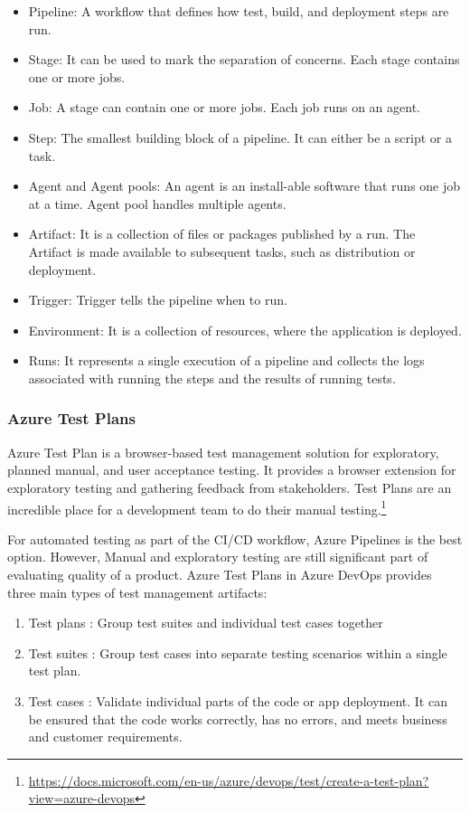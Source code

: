  \begin{itemize}
     \item Pipeline: A workflow that defines how test, build, and deployment steps are run.
     \item Stage: It can be used to mark the separation of concerns. Each stage contains one or more jobs.
     \item Job: A stage can contain one or more jobs. Each job runs on an agent.
     \item Step: The smallest building block of a pipeline. It can either be a script or a task.
     \item Agent and Agent pools: An agent is an install-able software that runs one job at a time. Agent pool handles multiple agents.
     \item Artifact: It is a collection of files or packages published by a run. The Artifact is made available to subsequent tasks, such as distribution or deployment.
     \item Trigger: Trigger tells the pipeline when to run.
     \item Environment: It is a collection of resources, where the application is deployed.
     \item Runs: It represents a single execution of a pipeline and collects the logs associated with running the steps and the results of running tests.
 \end{itemize}
%

\subsubsection{Azure Test Plans}
%
Azure Test Plan is a browser-based test management solution for exploratory, planned manual, and user acceptance testing. It provides a browser extension for exploratory testing and gathering feedback from stakeholders. Test Plans are an incredible place for a development team to do their manual testing.\footnote{\url{https://docs.microsoft.com/en-us/azure/devops/test/create-a-test-plan?view=azure-devops}}

For automated testing as part of the CI/CD workflow, Azure Pipelines is the best option. However, Manual and exploratory testing are still significant part of evaluating quality of a product. Azure Test Plans in Azure DevOps provides three main types of test management artifacts: 


\begin{enumerate}
    \item Test plans : Group test suites and individual test cases together
    \item Test suites : Group test cases into separate testing scenarios within a single test plan. 
    \item Test cases : Validate individual parts of the code or app deployment. It can be ensured that the code works correctly, has no errors, and meets business and customer requirements.
\end{enumerate}
%

